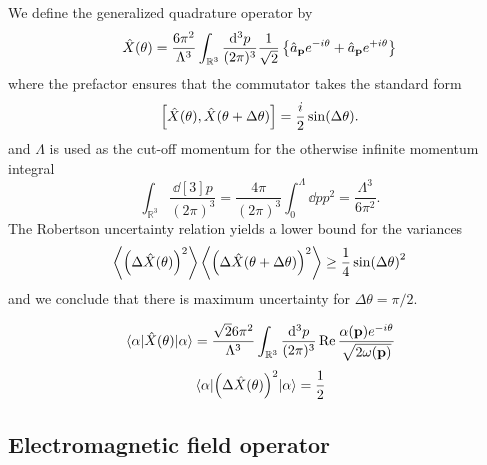 We define the generalized quadrature operator by 
\begin{equation}
	\hat{X}(\theta)
	=
	\frac{6\pi^2}{\Lambda^3}
	\int_{\mathbb{R}^3}
	\frac{\dd[3]{p}}{(2\pi)^3}
	\frac{1}{\sqrt{2}}
	\left\{
		\hat{a}_{\vb{p}}
		e^{-i\theta}
		+
		\hat{a}_{\vb{p}}
		e^{+i\theta}
	\right\}
\end{equation}
where the prefactor ensures that the commutator takes the standard form
\begin{equation}
	\comm{\hat{X}(\theta)}{\hat{X}(\theta+\Delta\theta)}
	=
	\frac{i}{2}
	\sin(\Delta\theta)
	.
\end{equation}
and $\Lambda$ is used as the cut-off momentum for the otherwise infinite momentum integral
\begin{equation}
	\int_{\mathbb{R}^3}\frac{\dd[3]{p}}{(2\pi)^3}
	=
	\frac{4\pi}{(2\pi)^3}
	\int_0^\Lambda\dd{p}p^2
	=
	\frac{\Lambda^3}{6\pi^2}
	.
\end{equation}
The Robertson uncertainty relation yields a lower bound for the variances
\begin{equation}
	\expval{\left(\Delta\hat{X}(\theta)\right)^2}
	\expval{\left(\Delta\hat{X}(\theta+\Delta\theta)\right)^2}
	\geq
	\frac{1}{4}
	\sin(\Delta\theta)^2
\end{equation}
and we conclude that there is maximum uncertainty for $\Delta\theta=\pi/2$.

\begin{equation}
	\expval{\hat{X}(\theta)}{\alpha}
	=
	\frac{\sqrt{2}6\pi^2}{\Lambda^3}
	\int_{\mathbb{R}^3}
	\frac{\dd[3]{p}}{(2\pi)^3}
	\operatorname{\operatorname{Re}}{\frac{\alpha(\vb{p})e^{-i\theta}}{\sqrt{2\omega(\vb{p})}}}
\end{equation}
\begin{equation}
	\expval{\left(\Delta\hat{X}(\theta)\right)^2}{\alpha}
	=
	\frac{1}{2}
\end{equation}

\subsection{Electromagnetic field operator}